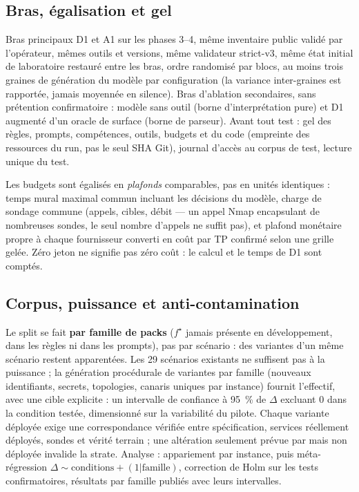 \documentclass[11pt,a4paper]{article}
\newcommand{\code}[1]{{\small\ttfamily\path{#1}}}
\begin{document}
\subsection{Bras, \'egalisation et gel}

Bras principaux D1 et A1 sur les phases 3--4, m\^eme inventaire public valid\'e par l'op\'erateur, m\^emes outils et versions, m\^eme validateur strict-v3, m\^eme \'etat initial de laboratoire restaur\'e entre les bras, ordre randomis\'e par blocs, au moins trois graines de g\'en\'eration du mod\`ele par configuration (la variance inter-graines est rapport\'ee, jamais moyenn\'ee en silence). Bras d'ablation secondaires, sans pr\'etention confirmatoire : mod\`ele sans outil (borne d'interpr\'etation pure) et D1 augment\'e d'un oracle de surface (borne de parseur). Avant tout test : gel des r\`egles, prompts, comp\'etences, outils, budgets et du code (empreinte des ressources du run, pas le seul SHA Git), journal d'acc\`es au corpus de test, lecture unique du test.

Les budgets sont \'egalis\'es en \emph{plafonds} comparables, pas en unit\'es identiques : temps mural maximal commun incluant les d\'ecisions du mod\`ele, charge de sondage commune (appels, cibles, d\'ebit --- un appel Nmap encapsulant de nombreuses sondes, le seul nombre d'appels ne suffit pas), et plafond mon\'etaire propre \`a chaque fournisseur converti en co\^ut par TP confirm\'e selon une grille gel\'ee. Z\'ero jeton ne signifie pas z\'ero co\^ut : le calcul et le temps de D1 sont compt\'es.

\subsection{Corpus, puissance et anti-contamination}

Le split se fait \textbf{par famille de packs} ($f^\star$ jamais pr\'esente en d\'eveloppement, dans les r\`egles ni dans les prompts), pas par sc\'enario : des variantes d'un m\^eme sc\'enario restent apparent\'ees. Les 29 sc\'enarios existants ne suffisent pas \`a la puissance ; la g\'en\'eration proc\'edurale de variantes par famille (nouveaux identifiants, secrets, topologies, canaris uniques par instance) fournit l'effectif, avec une cible explicite : un intervalle de confiance \`a 95~\% de $\Delta$ excluant 0 dans la condition test\'ee, dimensionn\'e sur la variabilit\'e du pilote. Chaque variante d\'eploy\'ee exige une correspondance v\'erifi\'ee entre sp\'ecification, services r\'eellement d\'eploy\'es, sondes et v\'erit\'e terrain ; une alt\'eration seulement pr\'evue par \code{scenario_alterations.py} mais non d\'eploy\'ee invalide la strate. Analyse : appariement par instance, puis m\'eta-r\'egression $\Delta \sim \text{conditions} + (1|\text{famille})$, correction de Holm sur les tests confirmatoires, r\'esultats par famille publi\'es avec leurs intervalles.
\end{document}
